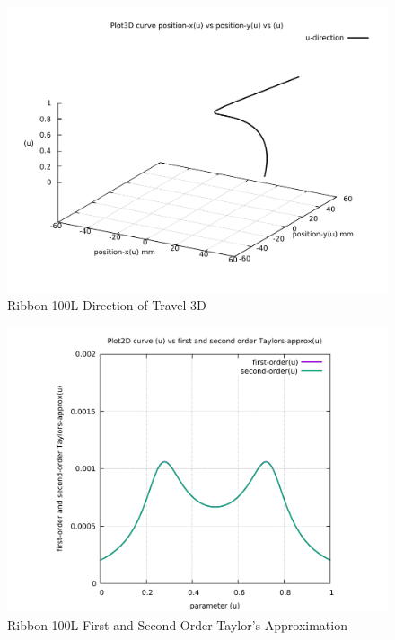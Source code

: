 \begin{figure}
	\caption     {Ribbon-100L Direction of Travel 3D}
	\label{04-img-Ribbon-100L Direction of Travel 3D.pdf}
	\includegraphics[width=1.00\textwidth]{Chap4/appendix/app-Ribbon-100L/plots/04-img-Ribbon-100L Direction of Travel 3D.pdf}
\end{figure}

\clearpage
\pagebreak

\begin{figure}
	\caption     {Ribbon-100L First and Second Order Taylor's Approximation}
	\label{05-img-Ribbon-100L-First-and-Second-Order-Taylors-Approx.pdf}
	\includegraphics[width=1.00\textwidth]{Chap4/appendix/app-Ribbon-100L/plots/05-img-Ribbon-100L-First-and-Second-Order-Taylors-Approx.pdf}
\end{figure}


